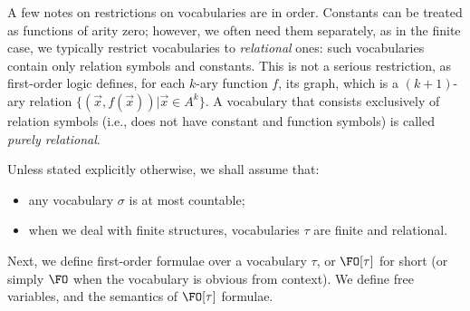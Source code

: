 A few notes on restrictions on vocabularies are in order. 
 Constants can be
 treated as functions of arity zero; however, we often need them separately, as
 in the finite case, we typically restrict vocabularies to {\em relational} ones: such vocabularies contain only relation symbols and constants. This is not a serious
restriction, as first-order logic defines, for each $k$-ary function $f$, its graph,
which is a $(k + 1)$-ary relation $\{( \overrightarrow{x}, f (\overrightarrow{x})) | \overrightarrow{x} \in A^k \}$. A vocabulary that consists exclusively of relation symbols (i.e., does not have constant and function symbols) is called {\em purely relational}.

Unless stated explicitly otherwise, we shall assume that:
\begin{itemize}
\item any vocabulary $\sigma$ is at most countable;
\item when we deal with finite structures, vocabularies $\tau$ are finite and relational.
\end{itemize}
						\fi




Next, we deﬁne first-order formulae over a vocabulary $\tau$, or $\FO[\tau]$ for short (or simply $\FO$ when the vocabulary is obvious from context). We define free variables, and
the semantics of $\FO[\tau]$ formulae.




